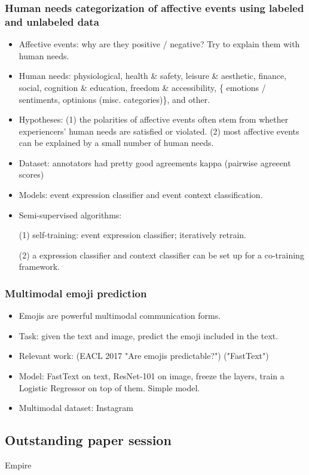 \subsubsection{Human needs categorization of affective events using labeled and unlabeled data\cite{Ding2018Human}}
\begin{itemize}
	\item Affective events: why are they positive / negative? Try to explain them with human needs.
	\item Human needs: physiological, health \& safety, leisure \& aesthetic, finance, social, cognition \& education, freedom \& accessibility, \{ emotions / sentiments, optinions (misc. categories)\}, and other.
	\item Hypotheses: (1) the polarities of affective events often stem from whether experiencers' human needs are satisfied or violated. (2) most affective events can be explained by a small number of human needs.
	\item Dataset: annotators had pretty good agreements kappa (pairwise agreeent scores)
	\item Models: event expression classifier and event context classification.
	\item Semi-supervised algorithms: 
	
	(1) self-training: event expression classifier; iteratively retrain.
	
	(2) a expression classifier and context classifier can be set up for a co-training framework.
\end{itemize}

\subsubsection{Multimodal emoji prediction \cite{Barbieri2018Multimodal}}
\begin{itemize}
	\item Emojis are powerful multimodal communication forms.
	\item Task: given the text and image, predict the emoji included in the text.
	\item Relevant work: (EACL 2017 "Are emojis predictable?") ("FastText")
	\item Model: FastText on text, ResNet-101 on image, freeze the layers, train a Logistic Regressor on top of them. Simple model.
	\item Multimodal dataset: Instagram
\end{itemize}


\subsection{Outstanding paper session}
Empire


